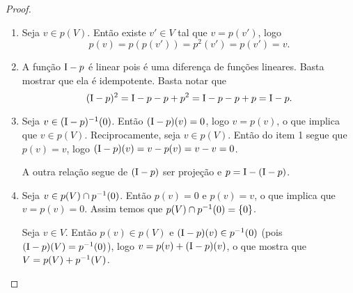 \begin{proof}
	\begin{enumerate}
	\item Seja $v \in p(V)$. Então existe $v' \in V$ tal que $v=p(v')$, logo
		\begin{equation*}
		p(v) = p(p(v')) = p^2(v') = p(v') = v.
		\end{equation*}

	\item A função $\mathrm{I}-p$ é linear pois é uma diferença de funções lineares. Basta mostrar que ela é idempotente. Basta notar que%
		\begin{equation*}
		(\mathrm{I}-p)^2 = \mathrm{I}-p-p+p^2 = \mathrm{I}-p-p+p = \mathrm{I}-p.
		\end{equation*}

	\item Seja $v \in (\mathrm{I}-p)^{-1}(0)$. Então $(\mathrm{I}-p)(v)=0$, logo $v=p(v)$, o que implica que $v \in p(V)$. Reciprocamente, seja $v \in p(V)$. Então do item 1 segue que $p(v) = v$, logo $(\mathrm{I}-p)(v) = v-p(v) = v-v = 0$.

A outra relação segue de $(\mathrm{I}-p)$ ser projeção e $p = \mathrm{I} - (\mathrm{I}-p)$.

	\item Seja $v \in p(V) \cap p^{-1}(0)$. Então $p(v)=0$ e $p(v)=v$, o que implica que $v = p(v) = 0$. Assim temos que $p(V) \cap p^{-1}(0) = \{0\}$.

	Seja $v \in V$. Então $p(v) \in p(V)$ e $(\mathrm{I}-p)(v) \in p^{-1}(0)$ (pois $(\mathrm{I}-p)(V) = p^{-1}(0)$), logo $v = p(v) + (\mathrm{I}-p)(v)$, o que mostra que $V = p(V) + p^{-1}(V)$.


\end{enumerate}
\end{proof}
